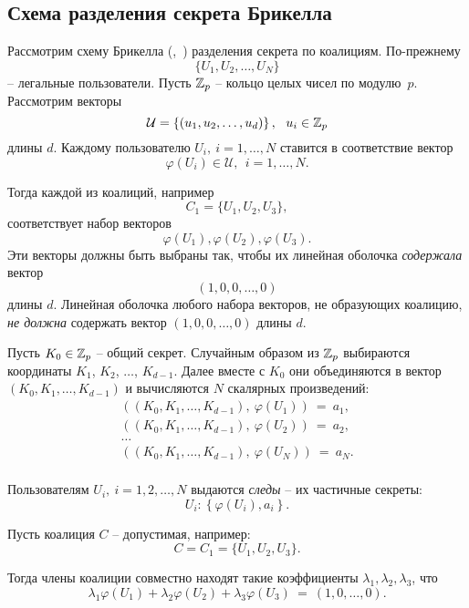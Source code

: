 \subsection{Схема разделения секрета Брикелла}

Рассмотрим схему Брикелла (,~\cite{Brickell:1990}) разделения секрета по коалициям. По-прежнему\[
	\{ U_1, U_2, \dots, U_N \}
\] -- легальные пользователи. Пусть $\mathbb{Z}_p$ -- кольцо целых чисел по модулю~$p$. Рассмотрим векторы
    \[ \mathcal{U} = \left\{ (u_1, u_2, \dots, u_d) \right\}, ~~ u_i \in \mathbb{Z}_p \]
длины $d$. Каждому пользователю $U_i, ~ i = 1, \dots, N$ ставится в соответствие вектор
    \[ \varphi(U_i) \in \mathcal{U}, ~~ i = 1, \dots, N. \]

Тогда каждой из коалиций, например
    \[ C_1 = \{ U_1, U_2, U_3 \}, \]
соответствует набор векторов
    \[ \varphi(U_1), \varphi(U_2), \varphi(U_3). \]
Эти векторы должны быть выбраны так, чтобы их линейная оболочка \emph{содержала} вектор
    \[ (1, 0, 0, \dots, 0) \]
длины $d$. Линейная оболочка любого набора векторов, не образующих коалицию, \emph{не должна} содержать вектор $(1, 0, 0, \dots, 0)$ длины $d$.

Пусть $K_0 \in \mathbb{Z}_p$ -- общий секрет. Случайным образом из $\mathbb{Z}_p$ выбираются координаты $K_1$, $K_2$, $\dots$, $K_{d-1}$. Далее вместе с $K_0$ они объединяются в вектор $(K_0, K_1, \dots, K_{d-1})$ и вычисляются $N$ скалярных произведений:
\[\begin{array}{l}
	\left( \left( K_0, K_1, \dots, K_{d-1} \right), ~ \varphi(U_1) \right) ~=~ a_1, \\
	\left( \left( K_0, K_1, \dots, K_{d-1} \right), ~ \varphi(U_2) \right) ~=~ a_2, \\
	\dots \\
	\left( \left( K_0, K_1, \dots, K_{d-1} \right), ~ \varphi(U_N) \right) ~=~ a_N. \\
\end{array}\]

Пользователям $U_i, ~ i = 1, 2, \dots, N$ выдаются \emph{следы} -- их частичные секреты:
    \[ U_i \colon \left\{ \varphi(U_i), a_i \right\}. \]

Пусть коалиция $C$ -- допустимая, например:
    \[ C = C_1 = \{ U_1, U_2, U_3 \}. \]

Тогда члены коалиции совместно находят такие коэффициенты $\lambda_1, \lambda_2, \lambda_3$, что
    \[ \lambda_1\varphi(U_1)+\lambda_2\varphi(U_2)+\lambda_3\varphi(U_3) ~=~ (1,0, \dots, 0). \]

